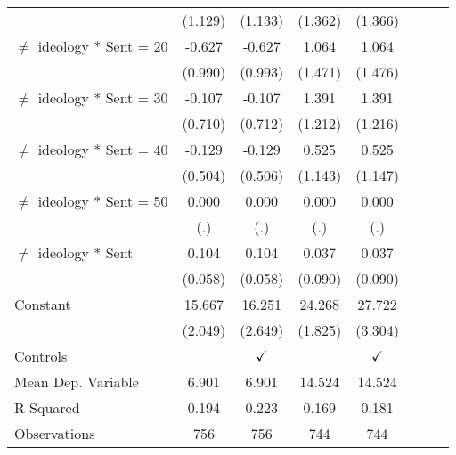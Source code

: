 \begin{table}[H]
{\begin{threeparttable}
\begin{tabular}{lccccccc}
                    &     (1.129)         &     (1.133)         &     (1.362)         &     (1.366)         \\
\addlinespace
$\neq$ ideology * Sent = 20&      -0.627         &      -0.627         &       1.064         &       1.064         \\
                    &     (0.990)         &     (0.993)         &     (1.471)         &     (1.476)         \\
\addlinespace
$\neq$ ideology * Sent = 30&      -0.107         &      -0.107         &       1.391         &       1.391         \\
                    &     (0.710)         &     (0.712)         &     (1.212)         &     (1.216)         \\
\addlinespace
$\neq$ ideology * Sent = 40&      -0.129         &      -0.129         &       0.525         &       0.525         \\
                    &     (0.504)         &     (0.506)         &     (1.143)         &     (1.147)         \\
\addlinespace
$\neq$ ideology * Sent = 50&       0.000         &       0.000         &       0.000         &       0.000         \\
                    &         (.)         &         (.)         &         (.)         &         (.)         \\
\addlinespace
$\neq$ ideology * Sent&       0.104\sym{*}  &       0.104\sym{*}  &       0.037         &       0.037         \\
                    &     (0.058)         &     (0.058)         &     (0.090)         &     (0.090)         \\
\addlinespace
Constant            &      15.667\sym{***}&      16.251\sym{***}&      24.268\sym{***}&      27.722\sym{***}\\
                    &     (2.049)         &     (2.649)         &     (1.825)         &     (3.304)         \\
\midrule
Controls            &                     &$\checkmark$         &                     &$\checkmark$         \\
\midrule
Mean Dep. Variable  &       6.901         &       6.901         &      14.524         &      14.524         \\
R Squared           &       0.194         &       0.223         &       0.169         &       0.181         \\
Observations        &         756         &         756         &         744         &         744         \\

\end{tabular}
\end{threeparttable}}
\end{table}
